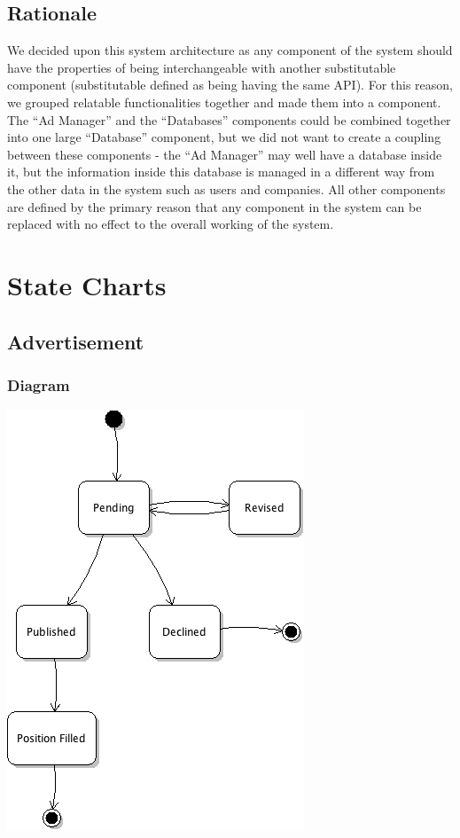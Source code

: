 \documentclass[12pt]{article}
\begin{document}
\subsection{Rationale}
We decided upon this system architecture as any component of the system should have the properties of being interchangeable with another substitutable component (substitutable defined as being having the same API). For this reason, we grouped relatable functionalities together and made them into a component. The ``Ad Manager'' and the ``Databases'' components could be combined together into one large ``Database'' component, but we did not want to create a coupling between these components - the ``Ad Manager'' may well have a database inside it, but the information inside this database is managed in a different way from the other data in the system such as users and companies.
All other components are defined by the primary reason that any component in the system can be replaced with no effect to the overall working of the system.
\newpage

\section{State Charts}

\subsection{Advertisement}

\subsubsection{Diagram}

\includegraphics{advertState.png}
\end{document}
